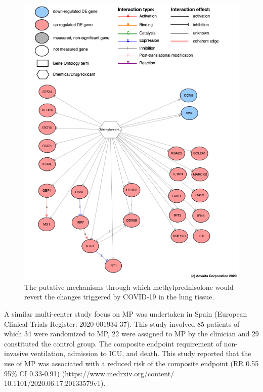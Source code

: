 \documentclass[Minh_PhD_thesis.tex]{subfiles}
\begin{document}
\begin{figure}
\centering
	\includegraphics[width=0.8\linewidth]{../Figures/Methylprednisolone_mechanism.png}
        \caption{The putative mechanisms through which methylprednisolone  would revert the  changes triggered by COVID-19  in the lung tissue.}
        \label{both_mechanisms}
\end{figure}

A similar multi-center study focus on MP was undertaken in Spain (European Clinical Trials Register: 2020-001934-37). This study involved 85 patients of which 34 were randomized to MP, 22 were assigned to MP by the clinician and 29 constituted the control group. The composite endpoint requirement of non-invasive ventilation, admission to ICU, and death. This study reported that the use of MP was associated with a reduced risk of the composite endpoint  (RR 0.55 95\% CI 0.33-0.91) ({https://www.medrxiv.org/content/\\10.1101/2020.06.17.20133579v1}).
\end{document}
